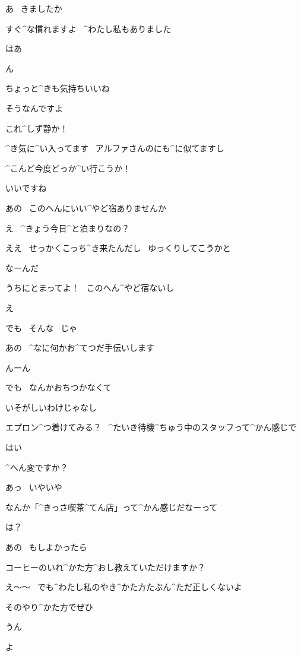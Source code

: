 \Kokone あ
\ きましたか

\Kokone すぐ^{な}{慣}れますよ
\ ^{わたし}{私}もありました

\Alpha はあ

\page
\Alpha ん

\Alpha ちょっと^{きも}{気持}ちいいね

\Kokone そうなんですよ

\Alpha これ^{しず}{静}か！

\Kokone ^{き}{気}に^{い}{入}ってます
\ アルファさんのにも^{に}{似}てますし

\Alpha ^{こんど}{今度}どっか^{い}{行}こうか！

\Kokone いいですね

\page
\Kokone あの
\ このへんにいい^{やど}{宿}ありませんか

\Alpha え
\ ^{きょう}{今日}^{と}{泊}まりなの？

\Kokone ええ
\ せっかくこっち^{き}{来}たんだし
\ ゆっくりしてこうかと

\Alpha なーんだ

\Alpha うちにとまってよ！
\ このへん^{やど}{宿}ないし

\Kokone え

\Kokone でも
\ そんな
\ じゃ

\page
\Kokone あの
\ ^{なに}{何}かお^{てつだ}{手伝}いします

\Alpha んーん

\Kokone でも
\ なんかおちつかなくて

\Alpha いそがしいわけじゃなし

\Alpha エプロン^{つ}{着}けてみる？
\ ^{たいき}{待機}^{ちゅう}{中}のスタッフって^{かん}{感}じで

\Kokone はい

\page
\Kokone ^{へん}{変}ですか？

\Alpha あっ
\ いやいや

\Alpha なんか「^{きっさ}{喫茶}^{てん}{店}」って^{かん}{感}じだなーって

\Kokone は？

\page
\Kokone あの
\ もしよかったら

\Kokone コーヒーのいれ^{かた}{方}^{おし}{教}えていただけますか？

\Alpha え〜〜
\ でも^{わたし}{私}のやき^{かた}{方}たぶん^{ただ}{正}しくないよ

\Kokone そのやり^{かた}{方}でぜひ

\Alpha うん

\page
\Ojisan よ

